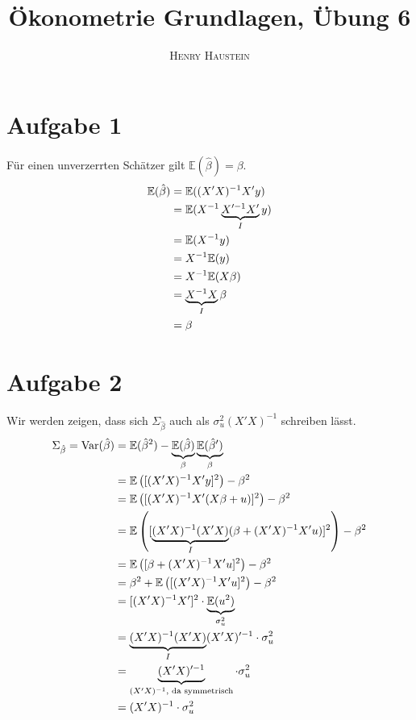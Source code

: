 \documentclass{article}
\title{\textbf{Ökonometrie Grundlagen, Übung 6}}
\author{\textsc{Henry Haustein}}
\date{}
\newcommand{\E}{\mathbb{E}}
\DeclareMathOperator{\Var}{Var}
\begin{document}
	\maketitle
	
	\section*{Aufgabe 1}
	Für einen unverzerrten Schätzer gilt $\E(\hat{\beta})=\beta$.
	\begin{align}
		\E(\hat{\beta}) &= \E((X'X)^{-1}X'y) \notag \\
		&= \E(X^{-1}\underbrace{X'^{-1}X'}_{I}y) \notag \\
		&= \E(X^{-1}y) \notag \\
		&= X^{-1}\E(y) \notag \\
		&= X^{-1}\E(X\beta) \notag \\
		&= \underbrace{X^{-1}X}_{I}\beta \notag \\
		&= \beta \notag
	\end{align}
	
	\section*{Aufgabe 2}
	Wir werden zeigen, dass sich $\Sigma_{\hat{\beta}}$ auch als $\sigma^2_u(X'X)^{-1}$ schreiben lässt.
	\begin{align}
		\Sigma_{\hat{\beta}} = \Var(\hat{\beta}) &= \E(\hat{\beta}^2) - \underbrace{\E(\hat{\beta})}_{\beta}\underbrace{\E(\hat{\beta}')}_{\beta} \notag \\
		&= \E\left([(X'X)^{-1}X'y]^2\right) - \beta^2 \notag \\
		&= \E\left( [(X'X)^{-1}X'(X\beta+u)]^2\right) - \beta^2 \notag \\
		&= \E\left([\underbrace{(X'X)^{-1}(X'X)}_{I}(\beta + (X'X)^{-1}X'u)]^2\right) - \beta^2 \notag \\
		&= \E \left( [\beta + (X'X)^{-1}X'u]^2\right) - \beta^2 \notag \\
		&= \beta^2 + \E\left([(X'X)^{-1}X'u]^2 \right) - \beta^2 \notag \\
		&= [(X'X)^{-1}X']^2\cdot \underbrace{\E(u^2)}_{\sigma_u^2} \notag \\
		&= \underbrace{(X'X)^{-1}(X'X)}_{I}(X'X)'^{-1} \cdot\sigma_u^2 \notag \\
		&= \underbrace{(X'X)'^{-1}}_{(X'X)^{-1}\text{, da symmetrisch}}\cdot\sigma_u^2 \notag \\
		&= (X'X)^{-1}\cdot\sigma_u^2 \notag
	\end{align}
	
\end{document}
